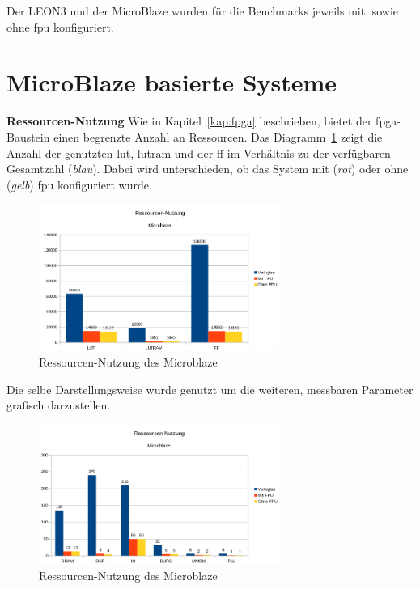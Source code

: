 Der LEON3 und der MicroBlaze wurden für die Benchmarks jeweils mit, sowie ohne \ac{fpu} konfiguriert.

\section{MicroBlaze basierte Systeme}\label{kap:microblaze}



\textbf{Ressourcen-Nutzung}
Wie in Kapitel~\ref{kap:fpga} beschrieben, bietet der \ac{fpga}-Baustein einen begrenzte Anzahl an Ressourcen.
Das Diagramm~\ref{fig:ressourcenmb1} zeigt die Anzahl der genutzten \ac{lut}, \ac{lutram} und der \ac{ff} im Verhältnis zu der verfügbaren Gesamtzahl (\emph{blau}). Dabei wird unterschieden,
ob das System mit (\emph{rot}) oder ohne (\emph{gelb}) \ac{fpu} konfiguriert wurde.\\

\begin{figure}[H]
\centering
\includegraphics[width=0.7\textwidth]{Hauptteil/ressourcenmb1.png}
\caption{Ressourcen-Nutzung des Microblaze}
\label{fig:ressourcenmb1}
\end{figure}

Die selbe Darstellungsweise wurde genutzt um die weiteren, messbaren Parameter grafisch darzustellen.\\

\begin{figure}[H]
\centering
\includegraphics[width=0.7\textwidth]{Hauptteil/ressourcenmb2.png}
\caption{Ressourcen-Nutzung des Microblaze}
\label{fig:ressourcenmb2}
\end{figure}


